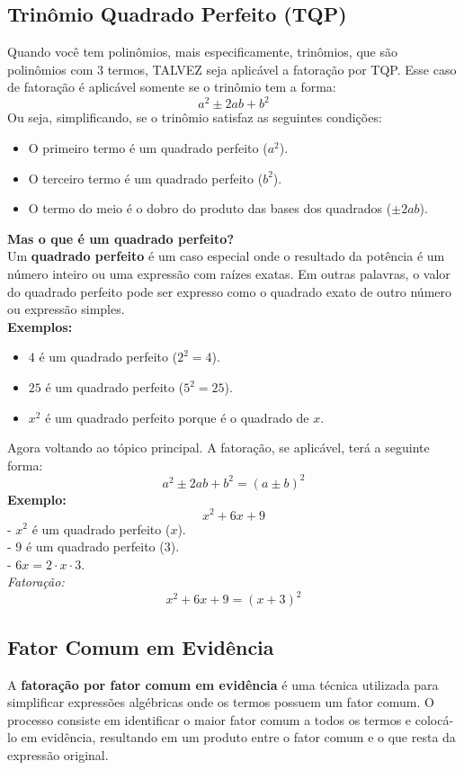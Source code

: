 \documentclass{article}
\begin{document}
\subsection{Trinômio Quadrado Perfeito (TQP)}
Quando você tem polinômios, mais especificamente, trinômios, que são polinômios com 3 termos, TALVEZ seja aplicável a fatoração por TQP. Esse caso de fatoração é aplicável somente se o trinômio tem a forma:
\[
a^2 \pm 2ab + b^2
\]
Ou seja, simplificando, se o trinômio satisfaz as seguintes condições:
\begin{itemize}
    \item O primeiro termo é um quadrado perfeito (\(a^2\)).
    \item O terceiro termo é um quadrado perfeito (\(b^2\)).
    \item O termo do meio é o dobro do produto das bases dos quadrados (\(\pm 2ab\)).
\end{itemize}
\textbf{Mas o que é um quadrado perfeito?}
\\[10pt]
Um \textbf{quadrado perfeito} é um caso especial onde o resultado da potência é um número inteiro ou uma expressão com raízes exatas. Em outras palavras, o valor do quadrado perfeito pode ser expresso como o quadrado exato de outro número ou expressão simples.
\\[10pt]
\textbf{Exemplos:}
\begin{itemize}
    \item \(4\) é um quadrado perfeito (\(2^2 = 4\)).
    \item \(25\) é um quadrado perfeito (\(5^2 = 25\)).
    \item \(x^2\) é um quadrado perfeito porque é o quadrado de \(x\).
\end{itemize}
Agora voltando ao tópico principal. A fatoração, se aplicável, terá a seguinte forma:
\[
a^2 \pm 2ab + b^2 = (a \pm b)^2
\]
\textbf{Exemplo:} \\
\[
x^2 + 6x + 9
\]
- \(x^2\) é um quadrado perfeito (\(x\)). \\
- \(9\) é um quadrado perfeito (\(3\)). \\
- \(6x = 2 \cdot x \cdot 3\). \\

\textit{Fatoração:} \\
\[
x^2 + 6x + 9 = (x + 3)^2
\]

\subsection{Fator Comum em Evidência}
A \textbf{fatoração por fator comum em evidência} é uma técnica utilizada para simplificar expressões algébricas onde os termos possuem um fator comum. O processo consiste em identificar o maior fator comum a todos os termos e colocá-lo em evidência, resultando em um produto entre o fator comum e o que resta da expressão original.
\end{document}
